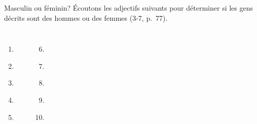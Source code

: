 \begin{frame}{Masculin ou féminin?}
  Écoutons les adjectifs suivants pour déterminer si les gens décrits sont des hommes ou des femmes (3-7, p.~77).
  \begin{columns}
      \begin{enumerate}
        \item \underline{}
        \item \underline{}
        \item \underline{\uncover<4->{femme\ }}
        \item \underline{}
        \item \underline{}
      \end{enumerate}
      \begin{enumerate}
        \setcounter{enumi}{5}
        \item \underline{}
        \item \underline{}
        \item \underline{\uncover<9->{homme}}
        \item \underline{}
        \item \underline{}
      \end{enumerate}
  \end{columns}
\end{frame}